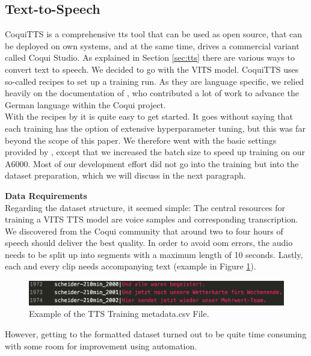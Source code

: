 \documentclass[
  a4paper,  %
  twoside,  %
  bibliography=totoc,
  headsepline,
  cleardoublepage=empty,
  parskip=half,
  draft=false
]{scrbook}
\begin{document}
\subsection{Text-to-Speech}
CoquiTTS is a comprehensive \gls*{tts} tool that can be used as open source, that can be deployed on own systems, and at the same time, drives a commercial variant called Coqui Studio. As explained in Section \ref{sec:tts} there are various ways to convert text to speech. We decided to go with the VITS model. CoquiTTS uses so-called recipes to set up a training run. As they are language specific, we relied heavily on the documentation of \citet{mullerThorstenVoice2023}, who contributed a lot of work to advance the German language within the Coqui project. \\
With the recipes by  it is quite easy to get started. It goes without saying that each training has the option of extensive hyperparameter tuning, but this was far beyond the scope of this paper. We therefore went with the basic settings provided by , except that we increased the batch size to speed up training on our A6000. Most of our development effort did not go into the training but into the dataset preparation, which we will discuss in the next paragraph.

\textbf{Data Requirements} \\
Regarding the dataset structure, it seemed simple: The central resources for training a VITS TTS model are voice samples and corresponding transcription. We discovered from the Coqui community that around two to four hours of speech should deliver the best quality. In order to avoid \gls{oom} errors, the audio needs to be split up into segments with a maximum length of 10 seconds. Lastly, each and every clip needs accompanying text (example in Figure \ref{fig:metadata.csv}).

\begin{figure}[h]
  \centering
  \includegraphics[width=1\textwidth]{./graphics/tts/csv.png}
  \caption{Example of the TTS Training metadata.csv File.}
  \label{fig:metadata.csv}
\end{figure}

However, getting to the formatted dataset turned out to be quite time consuming with some room for improvement using automation.
\end{document}

